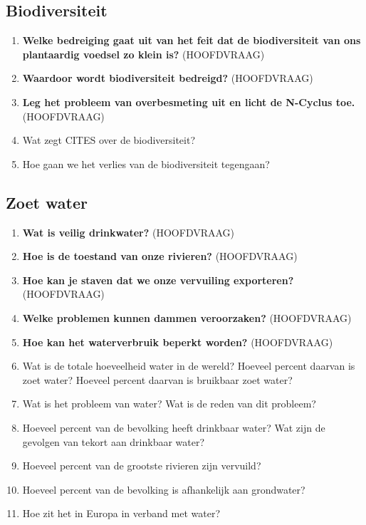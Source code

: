 \documentclass[a4paper,12pt]{article}
\begin{document}
    \subsection{Biodiversiteit}
    \begin{enumerate}
        \item \textbf{Welke bedreiging gaat uit van het feit dat de biodiversiteit van ons plantaardig voedsel zo klein is?} (HOOFDVRAAG)
        \item \textbf{Waardoor wordt biodiversiteit bedreigd?} (HOOFDVRAAG)
        \item \textbf{Leg het probleem van overbesmeting uit en licht de N-Cyclus toe.} (HOOFDVRAAG)
        \item Wat zegt CITES over de biodiversiteit?
        \item Hoe gaan we het verlies van de biodiversiteit tegengaan?
    \end{enumerate}

    \subsection{Zoet water}
    \begin{enumerate}
        \item \textbf{Wat is veilig drinkwater?} (HOOFDVRAAG)
        \item \textbf{Hoe is de toestand van onze rivieren?} (HOOFDVRAAG)
        \item \textbf{Hoe kan je staven dat we onze vervuiling exporteren?} (HOOFDVRAAG)
        \item \textbf{Welke problemen kunnen dammen veroorzaken?} (HOOFDVRAAG)
        \item \textbf{Hoe kan het waterverbruik beperkt worden?} (HOOFDVRAAG)
        \item Wat is de totale hoeveelheid water in de wereld? Hoeveel percent daarvan is zoet water? Hoeveel percent daarvan is bruikbaar zoet water?
        \item Wat is het probleem van water? Wat is de reden van dit probleem?
        \item Hoeveel percent van de bevolking heeft drinkbaar water? Wat zijn de gevolgen van tekort aan drinkbaar water?
        \item Hoeveel percent van de grootste rivieren zijn vervuild?
        \item Hoeveel percent van de bevolking is afhankelijk aan grondwater?
        \item Hoe zit het in Europa in verband met water?
    \end{enumerate}
\end{document}
